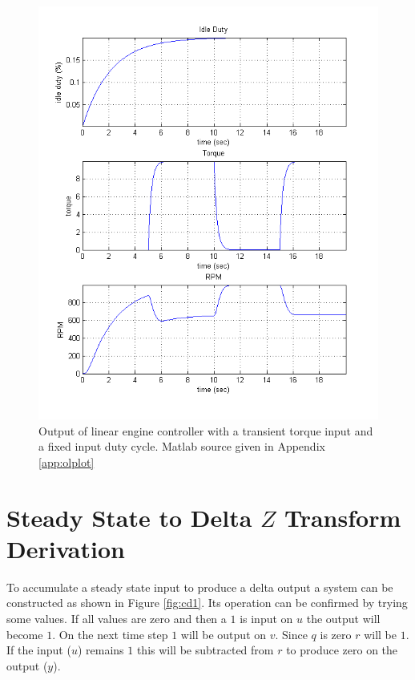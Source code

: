 \documentclass{article}
\begin{document}
\begin{figure}
\begin{center}
\includegraphics[scale=0.8]{img/linear_engine_model_no_control_plot}
\end{center}
\caption{Output of linear engine controller with a transient torque
input and a fixed input duty cycle.  Matlab source given in
Appendix \ref{app:olplot}}
\label{fig:olplot}
\end{figure}

\clearpage
\printbibliography[heading=bibintoc]

\clearpage
\appendix

\clearpage
\section{Steady State to Delta $Z$ Transform Derivation}
\label{app:cdelta}

To accumulate a steady state input to produce a delta output
a system can be constructed as shown in Figure \ref{fig:cd1}.
Its operation can be confirmed by trying some values.
If all values are zero and then a $1$ is input on $u$ the
output will become $1$.
On the next time step $1$ will be output on $v$.
Since $q$ is zero $r$ will be $1$.
If the input ($u$) remains $1$ this will be subtracted from $r$
to produce zero on the output ($y$).
\end{document}
